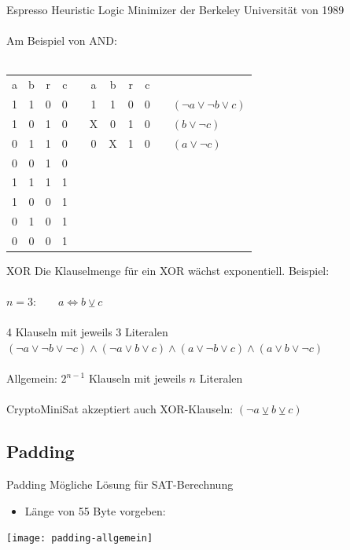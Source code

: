 \documentclass{beamer}
\begin{document}
    \begin{frame}{Espresso}
      Heuristic Logic Minimizer der Berkeley Universität von 1989\\
      ~\\
      Am Beispiel von AND:\\
      ~\\
      \begin{tabular}{ccc|cp{1cm}ccc|cp{1cm}l}
        a & b & r & c & & a & b & r & c\\
        \cline{1-4}\cline{6-9}
        1 & 1 & 0 & 0 & & 1 & 1 & 0 & 0 & & $ (\neg a \vee \neg b \vee c) $\\
        1 & 0 & 1 & 0 & & X & 0 & 1 & 0 & & $ (b \vee \neg c) $\\
        0 & 1 & 1 & 0 & & 0 & X & 1 & 0 & & $ (a \vee \neg c) $\\
        0 & 0 & 1 & 0 \\
        \cline{1-4}
        1 & 1 & 1 & 1 \\
        1 & 0 & 0 & 1 \\
        0 & 1 & 0 & 1 \\
        0 & 0 & 0 & 1 \\
      \end{tabular}
    \end{frame}
    \begin{frame}{XOR}
      Die Klauselmenge für ein XOR wächst exponentiell. Beispiel:\\
      ~\\
      $n = 3$:~~~~$ a \Leftrightarrow b \veebar c$\\
      ~\\
      4 Klauseln mit jeweils 3 Literalen
      ~\\
      $ (\neg a \vee \neg b \vee \neg c) \wedge (\neg a \vee b \vee c) \wedge (a \vee \neg b \vee c) \wedge (a \vee b \vee \neg c) $\\
      ~\\
      Allgemein: $ 2^{n - 1} $ Klauseln mit jeweils $ n $ Literalen\\
      ~\\
      CryptoMiniSat akzeptiert auch XOR-Klauseln: $ (\neg a \veebar b \veebar c)$\\
    \end{frame}
  \subsection{Padding}
    \begin{frame}{Padding}
      Mögliche Lösung für SAT-Berechnung\\
      \begin{itemize}
       \item Länge von 55 Byte vorgeben:
      \end{itemize}
      \texttt{[image: padding-allgemein]}
    \end{frame}
\end{document}
